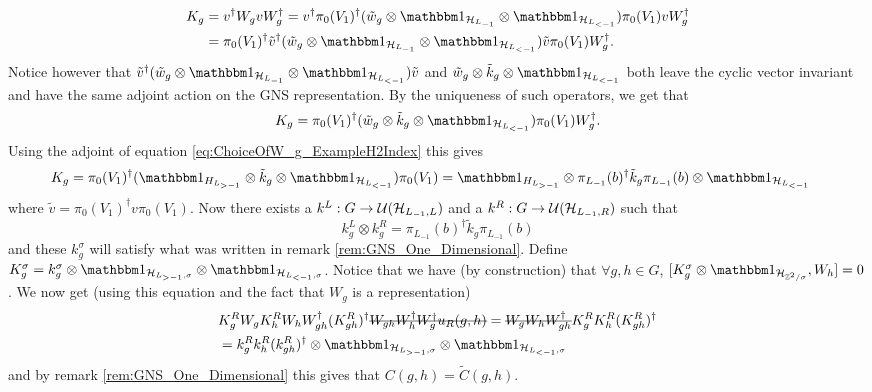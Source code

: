 \documentclass[11pt,a4paper,twoside]{article}
\numberwithin{equation}{section}
\begin{document}
	\begin{align}
		K_g&=v^\dagger W_g v W_g^\dagger=v^\dagger \pi_{0}(V_1)^{\dagger}(\tilde{w}_g\otimes\id_{\HH_{L_{-1}}}\otimes\id_{\HH_{L_{<-1}}}) \pi_{0}(V_1) v W_g^\dagger\\
		&=\pi_{0}(V_1)^{\dagger}\tilde v^\dagger(\tilde{w}_g\otimes\id_{\HH_{L_{-1}}}\otimes\id_{\HH_{L_{<-1}}}) \tilde v \pi_{0}(V_1) W_g^\dagger.
	\end{align}
	Notice however that $\tilde v^\dagger(\tilde{w}_g\otimes\id_{\HH_{L_{-1}}}\otimes\id_{\HH_{L_{<-1}}}) \tilde v$ and $\tilde{w}_g\otimes\tilde{k}_g\otimes\id_{\HH_{L_{<-1}}}$ both leave the cyclic vector invariant and have the same adjoint action on the GNS representation. By the uniqueness of such operators, we get that
	\begin{equation}
		K_g=\pi_{0}(V_1)^{\dagger}(\tilde{w}_g\otimes\tilde{k}_g\otimes\id_{\HH_{L_{<-1}}}) \pi_{0}(V_1) W_g^\dagger.
	\end{equation}
	Using the adjoint of equation \eqref{eq:ChoiceOfW_g_ExampleH2Index} this gives
	\begin{align}
		K_g&=\pi_{0}(V_1)^{\dagger}(\id_{H_{L_{>-1}}}\otimes \tilde k_g \otimes\id_{\HH_{L_{<-1}}}) \pi_{0}(V_1)=\id_{H_{L_{>-1}}}\otimes \pi_{L_{-1}}(b)^\dagger \tilde k_g \pi_{L_{-1}}(b) \otimes\id_{\HH_{L_{<-1}}}
	\end{align}
	where $\tilde{v}=\pi_0(V_1)^\dagger v\pi_0(V_1)$. Now there exists a $k^L:G\rightarrow \mathcal U(\mathcal H_{L_{-1},L})$ and a $k^R:G\rightarrow \mathcal U(\mathcal H_{L_{-1},R})$ such that
	\begin{equation}
		k^L_g\otimes k^R_g=\pi_{L_{-1}}(b)^\dagger \tilde k_g \pi_{L_{-1}}(b)
	\end{equation}
	and these $k^\sigma_g$ will satisfy what was written in remark \ref{rem:GNS_One_Dimensional}. Define $K^\sigma_g=k^\sigma_g\otimes\id_{\HH_{L_{>-1},\sigma}}\otimes\id_{\HH_{L_{<-1},\sigma}}$. Notice that we have (by construction) that $\forall g,h\in G$, $[K^\sigma_g\otimes\id_{\HH_{\ZZ^2/\sigma}},W_h]=0$. We now get (using this equation and the fact that $W_g$ is a representation)
	\begin{align}
		&K_g^R W_g K_h^R W_h W_{gh}^\dagger (K_{gh}^R)^\dagger \stkout{W_{gh}W_h^\dagger W_g^\dagger u_R(g,h)}=\stkout{W_g W_h W_{gh}^\dagger} K_g^R K_h^R (K_{gh}^R)^\dagger\\
		&=k_g^R k_h^R (k_{gh}^R)^\dagger\otimes \id_{\HH_{L_{>-1},\sigma}}\otimes\id_{\HH_{L_{<-1},\sigma}}
	\end{align}
	and by remark \ref{rem:GNS_One_Dimensional} this gives that $C(g,h)=\tilde{C}(g,h)$.
\end{document}
